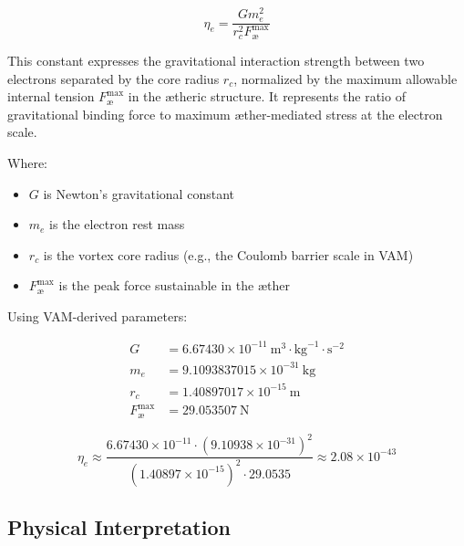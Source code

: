 \documentclass[preprint]{revtex4-2}
\begin{document}
                \begin{equation}
                \eta_e = \frac{G m_e^2}{r_c^2 F_{\text{\ae}}^{\text{max}}}
                \end{equation}

                This constant expresses the gravitational interaction strength between two electrons separated by the core radius \( r_c \), normalized by the maximum allowable internal tension \( F_{\text{\ae}}^{\text{max}} \) in the ætheric structure. It represents the ratio of gravitational binding force to maximum æther-mediated stress at the electron scale.

                \vspace{1em}
                \noindent Where:
                \begin{itemize}
                    \item \( G \) is Newton’s gravitational constant
                    \item \( m_e \) is the electron rest mass
                    \item \( r_c \) is the vortex core radius (e.g., the Coulomb barrier scale in VAM)
                    \item \( F_{\text{\ae}}^{\text{max}} \) is the peak force sustainable in the æther
                \end{itemize}

                Using VAM-derived parameters:

                \begin{align*}
                G &= 6.67430 \times 10^{-11}~\text{m}^3\cdot\text{kg}^{-1}\cdot\text{s}^{-2} \\
                m_e &= 9.1093837015 \times 10^{-31}~\text{kg} \\
                r_c &= 1.40897017 \times 10^{-15}~\text{m} \\
                F_{\text{\ae}}^{\text{max}} &= 29.053507~\text{N}
                \end{align*}

                \begin{equation}
                \eta_e \approx \frac{6.67430 \times 10^{-11} \cdot (9.10938 \times 10^{-31})^2}{(1.40897 \times 10^{-15})^2 \cdot 29.0535} \approx \boxed{2.08 \times 10^{-43}}
                \end{equation}

                \subsection*{Physical Interpretation}
\end{document}
